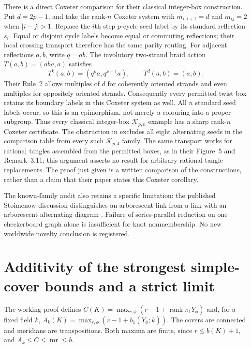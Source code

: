 \documentclass[11pt]{article}
\newcommand{\mr}{\operatorname{mr}}
\begin{document}
There is a direct Coxeter comparison for their classical
integer-box construction. Put $d=2p-1$, and take the rank-$n$
Coxeter system with $m_{i,i+1}=d$ and $m_{ij}=2$ when
$|i-j|>1$. Replace the $i$th step $p$-cycle seed label by
its standard reflection $s_i$. Equal or disjoint cycle labels
become equal or commuting reflections; their local crossing
transport therefore has the same parity routing. For adjacent
reflections $a,b$, write $q=ab$. The involutory two-strand
braid action $T(a,b)=(aba,a)$ satisfies
\[
 T^k(a,b)=(q^ka,q^{k-1}a),\qquad T^d(a,b)=(a,b).
\]
Their Rule~2 allows multiples of $d$ for coherently oriented
strands and even multiples for oppositely oriented strands.
Consequently every permitted twist box retains its boundary
labels in this Coxeter system as well. All $n$ standard seed
labels occur, so this is an epimorphism, not merely a colouring
into a proper subgroup. Thus every classical integer-box
$\mathcal K_{p,n}$ example has a sharp rank-$n$ Coxeter
certificate. The obstruction in
 excludes
all eight alternating seeds in the comparison table from every such
$\mathcal K_{p,4}$ family.
The same transport works for rational tangles assembled from
the permitted boxes, as in their Figure~5 and Remark~3.11;
this argument asserts no result for arbitrary rational
tangle replacements. The proof just given is a written
comparison of the constructions, rather than a claim that
their paper states this Coxeter corollary.

The known-family audit also retains a specific limitation:
the published Stoimenow discussion distinguishes an
arborescent link from a link with an arborescent alternating
diagram \cite[Proposition 6.3, Remark 6.4]{stoim}. Failure
of series-parallel reduction on one checkerboard graph
alone is insufficient for knot nonmembership. No new
worldwide novelty conclusion is registered.

\section{Additivity of the strongest simple-cover bounds and a strict limit}

The working proof 
defines $C(K)=\max_{r,\phi}(r-1+\operatorname{rank}\pi_1Y_\phi)$ and,
for a fixed field $k$, $A_k(K)=\max_{r,\phi}(r-1+b_1(Y_\phi;k))$.
The covers are connected and meridians are transpositions.
Both maxima are finite, since $r\le b(K)+1$, and
$A_k\le C\le\mr\le b$.
\end{document}
